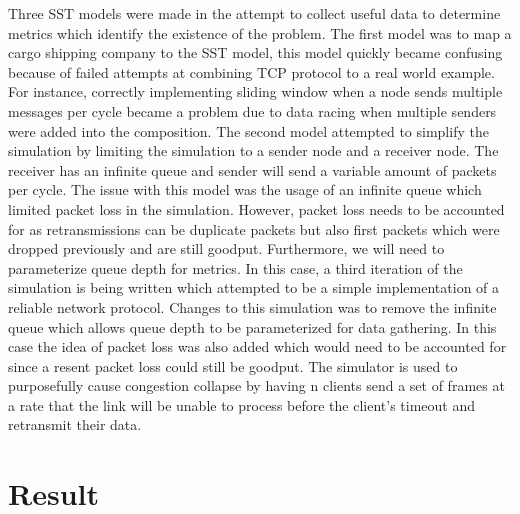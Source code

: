 \documentclass{article}
\begin{document}
\indent\indent Three SST models were made in the attempt to collect useful data to determine metrics which identify the existence of the problem. The first model was to map a cargo shipping company to the SST model, this model quickly became confusing because of failed attempts at combining TCP protocol to a real world example. For instance, correctly implementing sliding window when a node sends multiple messages per cycle became a problem due to data racing when multiple senders were added into the composition. \newline
\indent The second model attempted to simplify the simulation by limiting the simulation to a sender node and a receiver node. The receiver has an infinite queue and sender will send a variable amount of packets per cycle. The issue with this model was the usage of an infinite queue which limited packet loss in the simulation. However, packet loss needs to be accounted for as retransmissions can be duplicate packets but also first packets which were dropped previously and are still goodput. Furthermore, we will need to parameterize queue depth for metrics. \newline
\indent In this case, a third iteration of the simulation is being written which attempted to be a simple implementation of a reliable network protocol. Changes to this simulation was to remove the infinite queue which allows queue depth to be parameterized for data gathering. In this case the idea of packet loss was also added which would need to be accounted for since a resent packet loss could still be goodput.\newline
\indent The simulator is used to purposefully cause congestion collapse by having n clients send a set of frames at a rate that the link will be unable to process before the client's timeout and retransmit their data.

\section{Result} %
\end{document}
